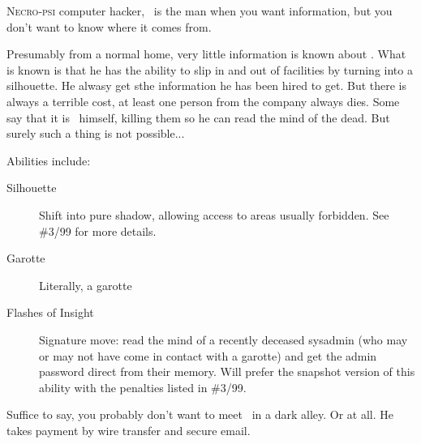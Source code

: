 \documentclass[a4paper,onepage]{memoir}
\begin{document}
\begin{npcdescription}
  \lettrine{N}{ecro-psi} computer hacker, \shadow\ is the man when you want
  information, but you don't want to know where it comes from.

  Presumably from a normal home, very little information is known about \shadow.
  What is known is that he has the ability to slip in and out of facilities by
  turning into a silhouette. He alwasy get sthe information he has been hired to
  get. But there is always a terrible cost, at least one person from the company
  always dies. Some say that it is \shadow\ himself, killing them so he can read
  the mind of the dead. But surely such a thing is not possible...


  Abilities include:
  \begin{description}
  \item[Silhouette] Shift into pure shadow, allowing access to areas usually
    forbidden. See \#3/99 for more details.
  \item[Garotte] Literally, a garotte
  \item[Flashes of Insight] Signature move: read the mind of a recently deceased
    sysadmin (who may or may not have come in contact with a garotte) and get
    the admin password direct from their memory. Will prefer the snapshot
    version of this ability with the penalties listed in \#3/99.
  \end{description}

  Suffice to say, you probably don't want to meet \shadow\ in a dark alley. Or
  at all. He takes payment by wire transfer and secure email.
\end{npcdescription}

\begin{multicols}{2}
  \GCPrintCharacter
  \ResetCharacterKey
\end{multicols}
\end{document}
